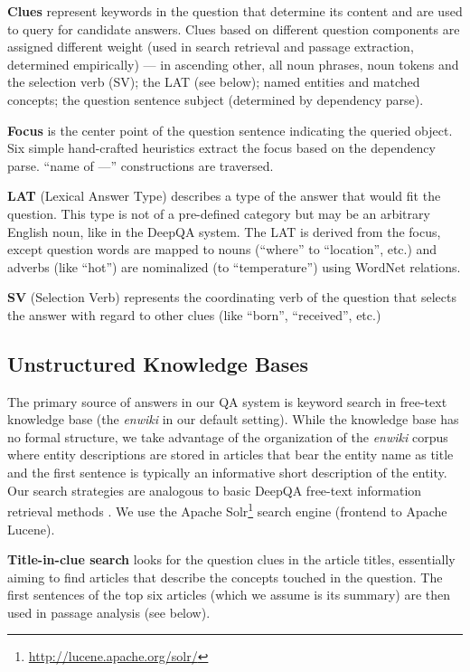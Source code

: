 \textbf{Clues} represent keywords in the question that determine its content
and are used to query for candidate answers.
Clues based on different question components are assigned different weight
(used in search retrieval and passage extraction, determined empirically) ---
in ascending other, all noun phrases, noun tokens and the selection verb (SV);
the LAT (see below); named entities and matched concepts;
the question sentence subject (determined by dependency parse).

\textbf{Focus} is the center point of the question sentence
indicating the queried object.
Six simple hand-crafted heuristics extract the focus based on the dependency parse.
``name of ---'' constructions are traversed.

\textbf{LAT} (Lexical Answer Type) describes a type of the answer that would fit the question.
This type is not of a pre-defined category but may be an arbitrary English noun,
like in the DeepQA system. \citep{WatsonTyCor}
The LAT is derived from the focus, except question words are mapped to nouns
(``where'' to ``location'', etc.)
and adverbs (like ``hot'') are nominalized (to ``temperature'') using WordNet relations.

\textbf{SV} (Selection Verb) represents the coordinating verb of the
question that selects the answer with regard to other clues (like ``born'',
``received'', etc.)

\subsection{Unstructured Knowledge Bases}

The primary source of answers in our QA system is keyword search in free-text knowledge base
(the \textit{enwiki} in our default setting).
While the knowledge base has no formal structure,
we take advantage of the organization of the \textit{enwiki} corpus
where entity descriptions are stored in articles that bear the entity name as title
and the first sentence is typically an informative short description of the entity.
Our search strategies are analogous to basic DeepQA free-text information retrieval methods \citep{WatsonIR}.
We use the Apache Solr\footnote{\url{http://lucene.apache.org/solr/}} search engine (frontend to Apache Lucene).

\textbf{Title-in-clue search} \citep{WatsonIR} looks for the question clues in the article titles,
essentially aiming to find articles that describe the concepts touched in the question.
The first sentences of the top six articles (which we assume is its summary)
are then used in passage analysis (see below).

